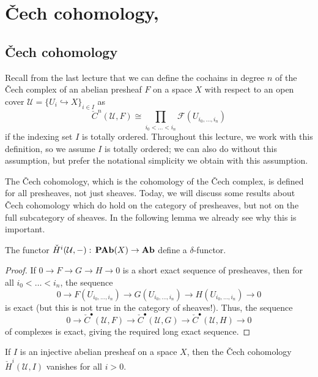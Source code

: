 \chapter{Čech cohomology, \todo{}}

\section{Čech cohomology}
\noindent
Recall from the last lecture that we can define the cochains in degree \(n\) of the Čech complex of an abelian presheaf \(F\) on a space \(X\) with respect to an open cover \(\mathcal U=\{U_i\hookrightarrow X\}_{i\in I}\) as
\[ \check{C}^n(\mathcal U,F) \cong \prod_{i_0<\ldots<i_n}\mathcal F(U_{i_0,\ldots,i_n}) \]
if the indexing set \(I\) is totally ordered.
Throughout this lecture, we work with this definition, so we assume \(I\) is totally ordered; we can also do without this assumption, but prefer the notational simplicity we obtain with this assumption.

The Čech cohomology, which is the cohomology of the Čech complex, is defined for all presheaves, not just sheaves.
Today, we will discuss some results about Čech cohomology which do hold on the category of presheaves, but not on the full subcategory of sheaves.
In the following lemma we already see why this is important.

\begin{lem}
The functor \(\check{H}^i(\mathcal U,-)\colon\catAbelianPresheaf(X)\to\catAbelianGroup\) define a \(\delta\)-functor.
\end{lem}
\begin{proof}
If \(0\to F\to G\to H\to 0\) is a short exact sequence of presheaves, then for all \(i_0<\ldots<i_n\), the sequence
\[ 0 \to F(U_{i_0,\ldots,i_n}) \to G(U_{i_0,\ldots,i_n}) \to H(U_{i_0,\ldots,i_n}) \to 0 \]
is exact (but this is not true in the category of sheaves!).
Thus, the sequence
\[ 0 \to \check{C}^\bullet(\mathcal U,F) \to \check{C}^\bullet(\mathcal U,G) \to \check{C}^\bullet(\mathcal U,H)\to 0 \]
of complexes is exact, giving the required long exact sequence.
\end{proof}

\begin{thm}\label{thm:Čech-chomology-vanishes-injective-presheaf}
If \(I\) is an injective abelian presheaf on a space \(X\), then the Čech cohomology \(\check{H}^i(\mathcal U,I)\) vanishes for all \(i>0\).
\end{thm}


